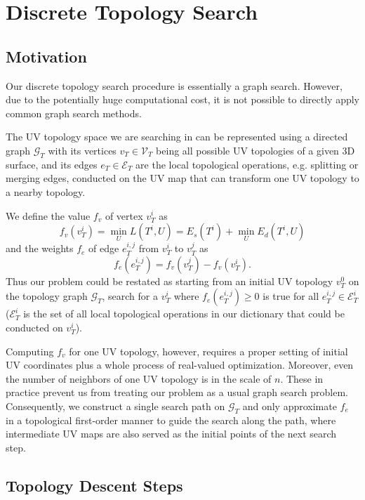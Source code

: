 
\section{Discrete Topology Search}
\label{sec:topologySearch}

\subsection{Motivation}
\label{sec:motivation}

Our discrete topology search procedure is essentially a graph search. However, due to the potentially huge computational cost, it is not possible to directly apply common graph search methods.

The UV topology space we are searching in can be represented using a directed graph $\mathcal{G}_T$ with its vertices $v_T \in \mathcal{V}_T$ being all possible UV topologies of a given 3D surface, and its edges $e_T \in \mathcal{E}_T$ are the local topological operations, e.g. splitting or merging edges, conducted on the UV map that can transform one UV topology to a nearby topology.

We define the value $f_v$ of vertex $v^i_T$ as 
\[ f_v(v^i_T) = \min_{U} L(T^i, U) = E_s(T^i) + \min_{U} E_d(T^i, U) \]
and the weights $f_e$ of edge $e^{i,j}_{T}$ from $v^i_T$ to $v^j_T$ as 
\[ f_e(e^{i,j}_T) = f_v(v^j_T) - f_v(v^i_T). \]
Thus our problem could be restated as starting from an initial UV topology $v^0_T$ on the topology graph $\mathcal{G}_T$, search for a $v^i_T$ where $f_e(e^{i,j}_T) \geq 0$ is true for all $e^{i,j}_T \in \mathcal{E}^i_T$ ($\mathcal{E}^i_T$ is the set of all local topological operations in our dictionary that could be conducted on $v^i_T$).

Computing $f_v$ for one UV topology, however, requires a proper setting of initial UV coordinates plus a whole process of real-valued optimization. Moreover, even the number of neighbors of one UV topology is in the scale of $n$. These in practice prevent us from treating our problem as a usual graph search problem. Consequently, we construct a single search path on $\mathcal{G}_T$ and only approximate $f_e$ in a topological first-order manner to guide the search along the path, where intermediate UV maps are also served as the initial points of the next search step.

\subsection{Topology Descent Steps}

